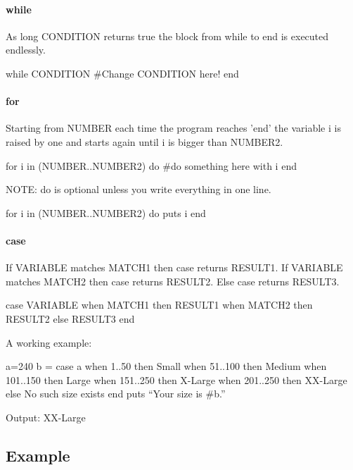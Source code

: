 \documentclass[10pt,a4paper]{scrartcl}
\begin{document}
\paragraph{while}
As long CONDITION returns true the block from while to end is executed endlessly.
\begin{terminalcode}
while CONDITION 
  #Change CONDITION here! 
end  
\end{terminalcode}

\paragraph{for}

Starting from NUMBER each time the program reaches 'end' the variable i is raised by one and starts again until i is bigger than NUMBER2.

\begin{terminalcode}
for i in (NUMBER..NUMBER2) do
  #do something here with i
end
\end{terminalcode}

\noindent NOTE: do is optional unless you write everything in one line.

\begin{terminalcode}
for i in (NUMBER..NUMBER2) do puts i end
\end{terminalcode}

\paragraph{case}

If VARIABLE  matches MATCH1 then case returns RESULT1. If VARIABLE  matches MATCH2 then case returns RESULT2. Else case returns RESULT3.
\begin{terminalcode}
case VARIABLE
  when MATCH1 then RESULT1
  when MATCH2 then RESULT2
  else RESULT3
end
\end{terminalcode}

\noindent A working example: 

\begin{terminalcode}
a=240
b = case a
      when 1..50 then Small
      when 51..100 then Medium
      when 101..150 then Large
      when 151..250 then X-Large
      when 201..250 then XX-Large
      else No such size exists
    end
    puts ``Your size is #{b}.''
\end{terminalcode}

\noindent Output: XX-Large

\subsection{Example}
\end{document}
